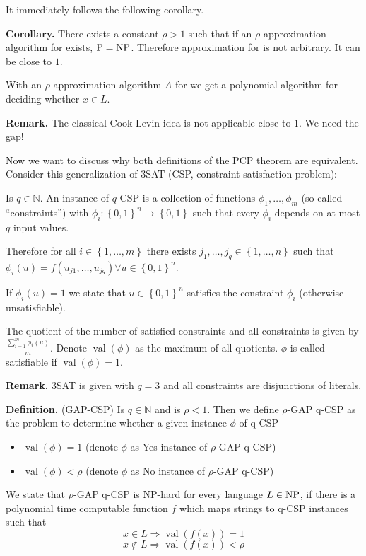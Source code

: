 \documentclass[a4paper]{article}
\newcommand{\cls}[1]{\rm{#1}}
\newcommand{\probl}[1]{\text{\textsc{#1}}}
\newcommand{\set}[1]{\left\{#1\right\}}
\begin{document}
It immediately follows the following corollary.

\textbf{Corollary.}
There exists a constant $\rho > 1$ such that if an $\rho$ approximation
algorithm for \probl{Max-3-SAT} exists, $\cls{P} = \cls{NP}$.
Therefore approximation for \probl{Max-3-SAT} is not arbitrary.
It can be close to $1$.

With an $\rho$ approximation algorithm $A$ for \probl{Max-3-SAT} we get a polynomial
algorithm for deciding whether $x \in L$.

\textbf{Remark.} The classical Cook-Levin idea is not applicable
  close to $1$. We need the gap!

Now we want to discuss why both definitions of the PCP theorem are equivalent.
Consider this generalization of 3SAT (CSP, constraint satisfaction problem):

Is $q \in \mathbb{N}$. An instance of $q$-CSP is a collection of functions
$\phi_1, \ldots, \phi_m$ (so-called ``constraints'') with $\phi_i:
\set{0,1}^n \rightarrow \set{0,1}$ such that every $\phi_i$ depends on at
most $q$ input values.

Therefore for all $i \in \set{1,\ldots,m}$ there exists $j_1,\ldots,j_q
\in \set{1,\ldots,n}$ such that $\phi_i(u) = f(u_{j1}, \ldots, u_{jq})
\forall u \in \set{0,1}^n$.

If $\phi_i(u) = 1$ we state that $u \in \set{0,1}^n$ satisfies the constraint
$\phi_i$ (otherwise unsatisfiable).

The quotient of the number of satisfied constraints and all constraints is given
by $\frac{\sum_{i=1}^m \phi_i(u)}{m}$. Denote $\operatorname{val}(\phi)$ as the
maximum of all quotients.
$\phi$ is called satisfiable if $\operatorname{val}(\phi) = 1$.

\textbf{Remark.} 3SAT is given with $q=3$ and all constraints are
  disjunctions of literals.

\textbf{Definition.} (GAP-CSP) Is $q \in \mathbb{N}$ and is $\rho < 1$.
  Then we define $\rho$-GAP q-CSP as the problem to determine whether
  a given instance $\phi$ of q-CSP
\begin{itemize}
  \item $\operatorname{val}(\phi) = 1$
    (denote $\phi$ as Yes instance of $\rho$-GAP q-CSP)
  \item $\operatorname{val}(\phi) < \rho$
    (denote $\phi$ as No instance of $\rho$-GAP q-CSP)
\end{itemize}

We state that $\rho$-GAP q-CSP is \cls{NP}-hard for every language $L \in \cls{NP}$,
if there is a polynomial time computable function $f$ which maps strings
to q-CSP instances such that
\[
  x \in L \Rightarrow \operatorname{val}(f(x)) = 1
\] \[
  x \notin L \Rightarrow \operatorname{val}(f(x)) < \rho
\]
\end{document}
